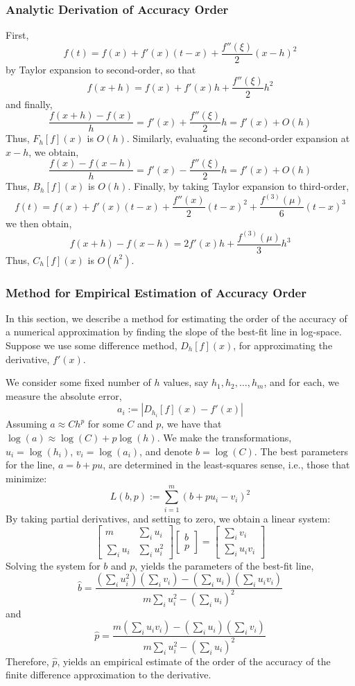 \documentclass[11pt]{article}
\begin{document}
\subsubsection{Analytic Derivation of Accuracy Order}
\label{subsection:accuracy-order-derivation}
First, 
$$
    f(t) = f(x) + f'(x)(t-x) + \frac{f''(\xi)}{2}(x-h)^2
$$
by Taylor expansion to second-order, so that
$$
    f(x+h) = f(x) + f'(x)h + \frac{f''(\xi)}{2}h^2
$$
and finally,
$$
    \frac{f(x+h)-f(x)}{h} = f'(x) + \frac{f''(\xi)}{2}h = f'(x) + O(h)
$$
Thus, $F_h[f](x)$ is $O(h)$. Similarly, evaluating the second-order expansion at $x-h$, we obtain, 
$$
    \frac{f(x)-f(x-h)}{h} = f'(x) - \frac{f''(\xi)}{2}h = f'(x) + O(h)
$$
Thus, $B_h[f](x)$ is $O(h)$. Finally, by taking Taylor expansion to third-order,
$$
    f(t) = f(x) + f'(x)(t-x) + \frac{f''(x)}{2}(t-x)^2 + \frac{f^{(3)}(\mu)}{6}(t-x)^3
$$
we then obtain,
$$
    f(x+h)-f(x-h) = 2f'(x)h  + \frac{f^{(3)}(\mu)}{3}h^3
$$
Thus, $C_h[f](x)$ is $O(h^2)$.

\subsubsection{Method for Empirical Estimation of Accuracy Order}
\label{subsection:accuracy-estimate}

In this section, we describe a method for estimating the order of the accuracy of a numerical approximation by finding the slope of the best-fit line in log-space. Suppose we use some difference method, $D_h[f](x)$, for approximating the derivative, $f'(x)$.

We consider some fixed number of $h$ values, say $h_1, h_2, \ldots, h_m$, and for each, we measure the absolute error,
$$
    a_i := |D_{h_i}[f](x)-f'(x)|
$$
Assuming $a \approx Ch^p$ for some $C$ and $p$, we have that $\log(a) \approx \log(C) + p\log(h)$. We make the transformations, $u_i = \log(h_i)$, $v_i = \log(a_i)$, and denote $b=\log(C)$. The best parameters for the line, $a = b + pu$, are determined in the least-squares sense, i.e., those that minimize:
$$
    L(b,p) := \sum_{i=1}^m \left(b+pu_i - v_i\right)^2
$$
By taking partial derivatives, and setting to zero, we obtain a linear system:
$$
    \begin{bmatrix}
        m          & \sum_i u_i \\
        \sum_i u_i & \sum_i u_i^2
    \end{bmatrix}
    \begin{bmatrix} b \\ p \end{bmatrix}
    =
    \begin{bmatrix} \sum_i v_i \\ \sum_i u_iv_i \end{bmatrix}
$$
Solving the system for $b$ and $p$, yields the parameters of the best-fit line,
$$
    \hat{b} = \frac{\left(\sum_i u_i^2\right) \left(\sum_i v_i\right) - \left(\sum_i u_i\right)\left(\sum_i u_iv_i\right)}{m\sum_i u_i^2 - \left(\sum_i u_i \right)^2}
$$
and
$$
    \hat{p} = \frac{m\left(\sum_i u_iv_i\right) - \left(\sum_i u_i\right)\left(\sum_i v_i\right)}{m\sum_i u_i^2 - \left(\sum_i u_i \right)^2}
$$
Therefore, $\hat{p}$, yields an empirical estimate of the order of the accuracy of the finite difference approximation to the derivative.
\end{document}
